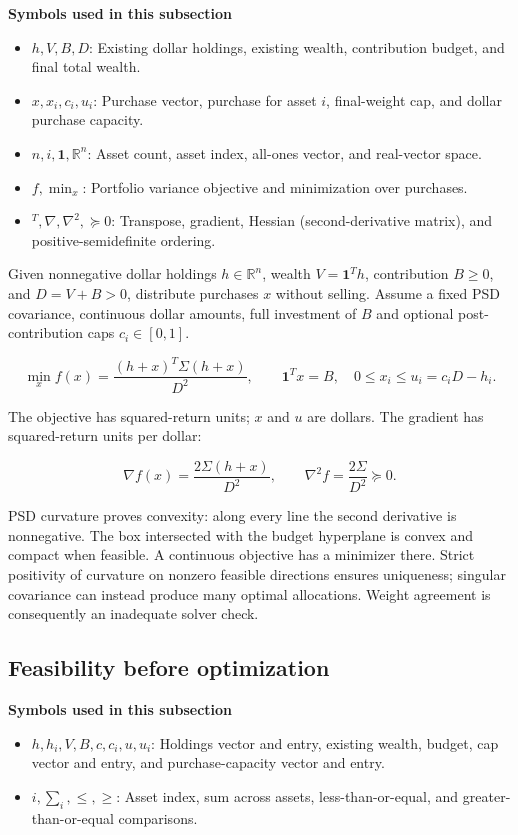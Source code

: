 \documentclass[
  american,
  11pt,
]{article}
\begin{document}
\textbf{Symbols used in this subsection}
\begin{itemize}
\item \(h,V,B,D\): Existing dollar holdings, existing wealth, contribution budget, and final total wealth.
\item \(x,x_i,c_i,u_i\): Purchase vector, purchase for asset $i$, final-weight cap, and dollar purchase capacity.
\item \(n,i,\mathbf1,\mathbb R^n\): Asset count, asset index, all-ones vector, and real-vector space.
\item \(f,\min_x\): Portfolio variance objective and minimization over purchases.
\item \({}^T,\nabla,\nabla^2,\succeq0\): Transpose, gradient, Hessian (second-derivative matrix), and positive-semidefinite ordering.
\end{itemize}


Given nonnegative dollar holdings \(h\in\mathbb R^n\), wealth
\(V=\mathbf1^Th\), contribution \(B\ge0\), and \(D=V+B>0\), distribute
purchases \(x\) without selling. Assume a fixed PSD covariance,
continuous dollar amounts, full investment of \(B\) and optional
post-contribution caps \(c_i\in[0,1]\).

\[\min_x f(x)=\frac{(h+x)^T\Sigma(h+x)}{D^2},\qquad
\mathbf1^Tx=B,\quad 0\le x_i\le u_i=c_iD-h_i.\]

The objective has squared-return units; \(x\) and \(u\) are dollars. The
gradient has squared-return units per dollar:

\[\nabla f(x)=\frac{2\Sigma(h+x)}{D^2},\qquad
\nabla^2 f=\frac{2\Sigma}{D^2}\succeq0.\]

PSD curvature proves convexity: along every line the second derivative
is nonnegative. The box intersected with the budget hyperplane is convex
and compact when feasible. A continuous objective has a minimizer there.
Strict positivity of curvature on nonzero feasible directions ensures
uniqueness; singular covariance can instead produce many optimal
allocations. Weight agreement is consequently an inadequate solver
check.

\subsection{Feasibility before
optimization}\label{feasibility-before-optimization}

\textbf{Symbols used in this subsection}
\begin{itemize}
\item \(h,h_i,V,B,c,c_i,u,u_i\): Holdings vector and entry, existing wealth, budget, cap vector and entry, and purchase-capacity vector and entry.
\item \(i,\sum_i,\le,\ge\): Asset index, sum across assets, less-than-or-equal, and greater-than-or-equal comparisons.
\end{itemize}
\end{document}
